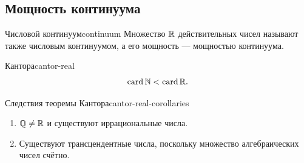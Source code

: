 \subsection{Мощность континуума}

\begin{definition}{Числовой континуум}{continuum}
  Множество $\mathbb{R}$ действительных чисел называют также числовым континуумом,
  а его мощность — мощностью континуума.
\end{definition}

\begin{theorem}{Кантора}{cantor-real}
  \[
    \operatorname{card}\mathbb{N}<\operatorname{card}\mathbb{R}.
  \]
\end{theorem}

\begin{corollary}{Следствия теоремы Кантора}{cantor-real-corollaries}
  \begin{enumerate}[label=\arabic*)]
    \item $\mathbb{Q}\ne\mathbb{R}$ и существуют иррациональные числа.\par
    \item Существуют трансцендентные числа, поскольку множество
      алгебраических чисел счётно.
  \end{enumerate}
\end{corollary}
